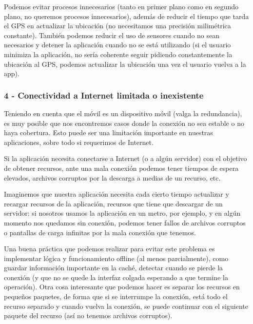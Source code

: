 Podemos evitar procesos innecesarios (tanto en primer plano como en segundo plano, no queremos procesos innecesarios), además de reducir el tiempo que tarda el GPS en actualizar la ubicación (no necesitamos una precisión milimétrica constante). También podemos reducir el uso de sensores cuando no sean necesarios y detener la aplicación cuando no se está utilizando (si el usuario minimiza la aplicación, no sería coherente seguir pidiendo constantemente la ubicación al GPS, podemos actualizar la ubicación una vez el usuario vuelva a la app).

\subsubsection*{4 - Conectividad a Internet limitada o inexistente}

Teniendo en cuenta que el móvil es un dispositivo móvil (valga la redundancia), es muy posible que nos encontremos casos donde la conexión no sea estable o no haya cobertura. Esto puede ser una limitación importante en nuestras aplicaciones, sobre todo si requerimos de Internet.

Si la aplicación necesita conectarse a Internet (o a algún servidor) con el objetivo de obtener recursos, ante una mala conexión podemos tener tiempos de espera elevados, archivos corruptos por la descarga a medias de un recurso, etc.

Imaginemos que nuestra aplicación necesita cada cierto tiempo actualizar y recargar recursos de la aplicación, recursos que tiene que descargar de un servidor: si nosotros usamos la aplicación en un metro, por ejemplo, y en algún momento nos quedamos sin conexión, podemos tener fallos de archivos corruptos o pantallas de carga infinitas por la mala conexión que tenemos.

Una buena práctica que podemos realizar para evitar este problema es implementar lógica y funcionamiento offline (al menos parcialmente), como guardar información importante en la caché, detectar cuando se pierde la conexión (y que no se quede la interfaz colgada esperando a que termine la operación). Otra cosa interesante que podemos hacer es separar los recursos en pequeños paquetes, de forma que si se interrumpe la conexión, está todo el recurso separado y cuando vuelva la conexión, se puede continuar con el siguiente paquete del recurso (así no tenemos archivos corruptos).

